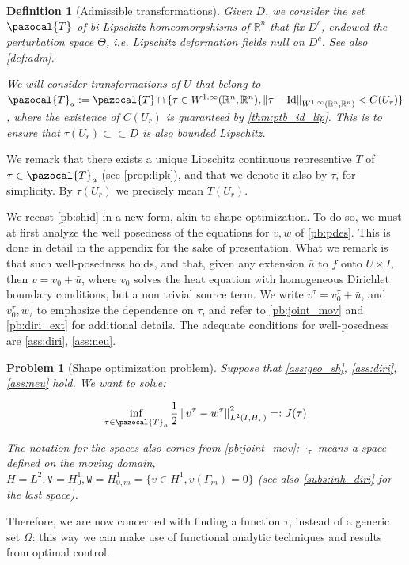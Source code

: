 \documentclass[english,a4paper,9pt,oneside]{scrbook}	%
\theoremstyle{break}
\newtheorem{defn}[equation]{Definition}
\newtheorem{pb}[equation]{Problem}
\theoremstyle{remark}
\newcommand{\mR}{\mathbb{R}}
\newcommand{\norm}[1]{\left\lVert#1\right\rVert}
\newcommand{\cc}{\subset\subset}
\newcommand{\cT}{\pazocal{T}}
\newcommand{\id}{\text{Id}}
\newcommand{\Te}{\Theta}
\newcommand{\tw}[1]{\texttt{#1}}
\begin{document}
\begin{defn}[Admissible transformations]

Given $D$, we consider the set $\cT$ of bi-Lipschitz homeomorpshisms of $\mR^n$ that fix $D^c$, endowed the perturbation space $\Te$, i.e. Lipschitz deformation fields null on $D^c$. See also \cref{def:adm}.

We will consider transformations of $U$ that belong to $\cT_a:=\cT \cap \{ \tau \in W^{1,\infty}(\mR^n, \mR^n), \norm{\tau - \id}_{W^{1,\infty}(\mR^n, \mR^n)}<C(U_r)\}$, where the existence of $C(U_r)$ is guaranteed by \cref{thm:ptb_id_lip}. This is to ensure that $\tau(U_r)\cc D$ is also bounded Lipschitz.


\end{defn}

We remark that there exists a unique Lipschitz continuous representive $T$ of $\tau \in \cT_a$ (see \cref{prop:lipk}), and that we denote it also by $\tau$, for simplicity. By $\tau(U_r)$ we precisely mean $T(U_r)$.

We recast \cref{pb:shid} in a new form, akin to shape optimization. To do so, we must at first analyze the well posedness of the equations for $v,w$ of \cref{pb:pdes}. This is done in detail in the appendix for the sake of presentation. What we remark is that such well-posedness holds, and that, given any extension $\bar{u}$ to $f$ onto $U\times I$, then $v = v_0+\bar{u}$, where $v_0$ solves the heat equation with homogeneous Dirichlet boundary conditions, but a non trivial source term. We write $v^\tau = v_0^\tau + \bar{u}$, and $v_0^\tau, w_\tau$ to emphasize the dependence on $\tau$, and refer to \cref{pb:joint_mov} and \cref{pb:diri_ext} for additional details. The adequate conditions for well-posedness are \cref{ass:diri}, \cref{ass:neu}.

\begin{pb}[Shape optimization problem]
\label{pb:shopt}
Suppose that \cref{ass:geo_sh}, \cref{ass:diri}, \cref{ass:neu} hold. We want to solve:

$$\inf_{\tau \in \cT_a}\frac{1}{2}\norm{v^\tau-w^\tau}_{L^2(I,H_\tau)}^2=:J(\tau)$$

The notation for the spaces also comes from  \cref{pb:joint_mov}: $\cdot_\tau$ means a space defined on the moving domain, $H=L^2, \tw{V}=H^1_0, \tw{W} = H^1_{0,m}=\{v \in H^1, v(\Gamma_m)=0\}$ (see also \cref{subs:inh_diri} for the last space).

\end{pb}

Therefore, we are now concerned with finding a function $\tau$, instead of a generic set $\Omega$: this way we can make use of functional analytic techniques and results from optimal control.
\end{document}
